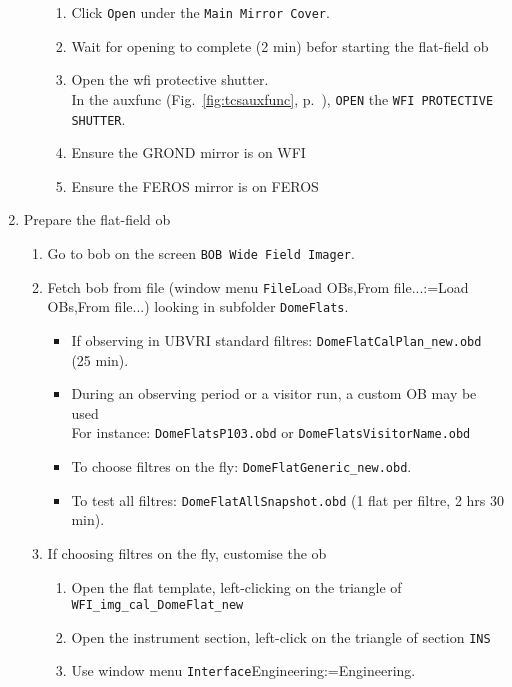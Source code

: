 \documentclass[11pt,fleqn]{book}
\makeatletter
\def\menu#1#2{\texttt{#1}\ifx{}#2\else\@for\@x:=#2\do{$\rightarrow$\texttt{\@x}}\fi}
\def\wmenu#1#2{window menu \menu{#1}{#2}}
\def\fetchob{\wmenu{File}{Load OBs,From file...}}
\def\figref#1{Fig.~\ref{fig:#1}, p.~\pageref{fig:#1}}
\makeatother
\begin{document}
\begin{enumerate}
\begin{enumerate}
            \begin{enumerate}
               \item Click \texttt{Open} under the \texttt{Main Mirror Cover}.
               \item Wait for opening to complete (2 min) befor starting the flat-field \gls{ob}
               \item Open the \gls{wfi} protective shutter.\\
                     In the \gls{auxfunc} (\figref{tcsauxfunc}), \texttt{OPEN} the \texttt{WFI PROTECTIVE SHUTTER}.
               \item Ensure the GROND mirror is on WFI
               \item Ensure the FEROS mirror is on FEROS
             \end{enumerate}
         \end{enumerate}
     \item Prepare the flat-field \gls{ob}
     \begin{enumerate}
        \item Go to \gls{bob} on the screen \texttt{BOB Wide Field Imager}.
        \item Fetch \gls{bob} from file (\fetchob) looking in subfolder \texttt{DomeFlats}.
        \begin{itemize}
           \item If observing in UBVRI standard filtres: \texttt{DomeFlatCalPlan\_new.obd} (25 min).
           \item During an observing period or a visitor run, a custom OB may be used\\
    For instance: \texttt{DomeFlatsP103.obd} or \texttt{DomeFlatsVisitorName.obd}
           \item To choose filtres on the fly: \texttt{DomeFlatGeneric\_new.obd}.
           \item To test all filtres: \texttt{DomeFlatAllSnapshot.obd} (1 flat per filtre, 2 hrs 30 min).
        \end{itemize}
        \item If choosing filtres on the fly, customise the ob
              \begin{enumerate}
                 \item Open the flat template, left-clicking on the triangle of \texttt{WFI\_img\_cal\_DomeFlat\_new}
                 \item Open the instrument section, left-click on the triangle of section \texttt{INS}
                 \item Use \wmenu{Interface}{Engineering}.

\end{enumerate}
\end{enumerate}
\end{enumerate}
\end{document}
